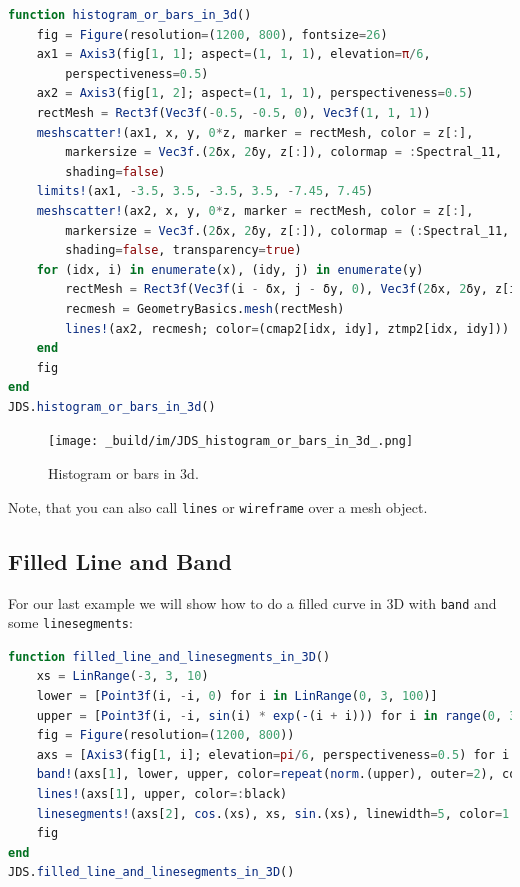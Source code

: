 \documentclass[
  notoc %
]{tufte-book}
\newcommand{\passthrough}[1]{#1}
\begin{document}
\begin{lstlisting}[language=Julia]
function histogram_or_bars_in_3d()
    fig = Figure(resolution=(1200, 800), fontsize=26)
    ax1 = Axis3(fig[1, 1]; aspect=(1, 1, 1), elevation=π/6,
        perspectiveness=0.5)
    ax2 = Axis3(fig[1, 2]; aspect=(1, 1, 1), perspectiveness=0.5)
    rectMesh = Rect3f(Vec3f(-0.5, -0.5, 0), Vec3f(1, 1, 1))
    meshscatter!(ax1, x, y, 0*z, marker = rectMesh, color = z[:],
        markersize = Vec3f.(2δx, 2δy, z[:]), colormap = :Spectral_11,
        shading=false)
    limits!(ax1, -3.5, 3.5, -3.5, 3.5, -7.45, 7.45)
    meshscatter!(ax2, x, y, 0*z, marker = rectMesh, color = z[:],
        markersize = Vec3f.(2δx, 2δy, z[:]), colormap = (:Spectral_11, 0.25),
        shading=false, transparency=true)
    for (idx, i) in enumerate(x), (idy, j) in enumerate(y)
        rectMesh = Rect3f(Vec3f(i - δx, j - δy, 0), Vec3f(2δx, 2δy, z[idx, idy]))
        recmesh = GeometryBasics.mesh(rectMesh)
        lines!(ax2, recmesh; color=(cmap2[idx, idy], ztmp2[idx, idy]))
    end
    fig
end
JDS.histogram_or_bars_in_3d()
\end{lstlisting}

\begin{figure}
\hypertarget{fig:histogram_or_bars_in_3d}{%
\centering
\texttt{[image: \_build/im/JDS\_histogram\_or\_bars\_in\_3d\_.png]}
\caption{Histogram or bars in 3d.}\label{fig:histogram_or_bars_in_3d}
}
\end{figure}

Note, that you can also call \passthrough{\lstinline!lines!} or
\passthrough{\lstinline!wireframe!} over a mesh object.

\hypertarget{filled-line-and-band}{%
\subsection{Filled Line and Band}\label{filled-line-and-band}}

For our last example we will show how to do a filled curve in 3D with
\passthrough{\lstinline!band!} and some
\passthrough{\lstinline!linesegments!}:

\begin{lstlisting}[language=Julia]
function filled_line_and_linesegments_in_3D()
    xs = LinRange(-3, 3, 10)
    lower = [Point3f(i, -i, 0) for i in LinRange(0, 3, 100)]
    upper = [Point3f(i, -i, sin(i) * exp(-(i + i))) for i in range(0, 3, length=100)]
    fig = Figure(resolution=(1200, 800))
    axs = [Axis3(fig[1, i]; elevation=pi/6, perspectiveness=0.5) for i = 1:2]
    band!(axs[1], lower, upper, color=repeat(norm.(upper), outer=2), colormap=:CMRmap)
    lines!(axs[1], upper, color=:black)
    linesegments!(axs[2], cos.(xs), xs, sin.(xs), linewidth=5, color=1:length(xs))
    fig
end
JDS.filled_line_and_linesegments_in_3D()
\end{lstlisting}
\end{document}
